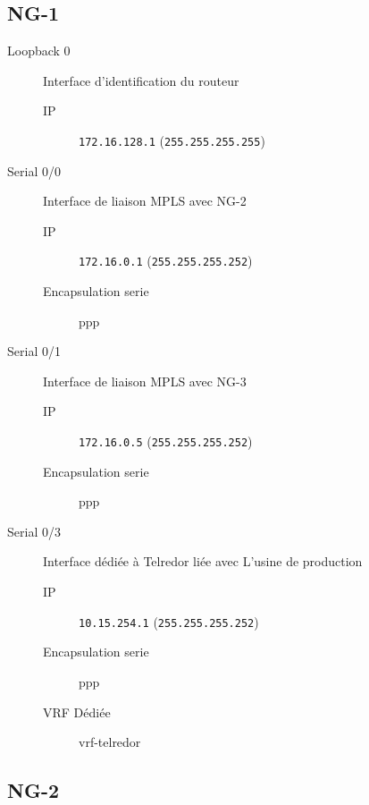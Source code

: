 \subsection{NG-1}

	\begin{description}
		\item[Loopback 0] Interface d'identification du routeur
		\begin{description}
			\item[IP] \texttt{172.16.128.1} (\texttt{255.255.255.255})
		\end{description}

		\item[Serial 0/0] Interface de liaison MPLS avec NG-2
		\begin{description}
			\item[IP] \texttt{172.16.0.1} (\texttt{255.255.255.252})
			\item[Encapsulation serie] ppp
		\end{description}

		\item[Serial 0/1] Interface de liaison MPLS avec NG-3
		\begin{description}
			\item[IP] \texttt{172.16.0.5} (\texttt{255.255.255.252})
			\item[Encapsulation serie] ppp
		\end{description}

		\item[Serial 0/3] Interface dédiée à Telredor liée avec L'usine de production
		\begin{description}
			\item[IP] \texttt{10.15.254.1} (\texttt{255.255.255.252})
			\item[Encapsulation serie] ppp
			\item[VRF Dédiée] vrf-telredor
		\end{description}

	\end{description}
\subsection{NG-2}

